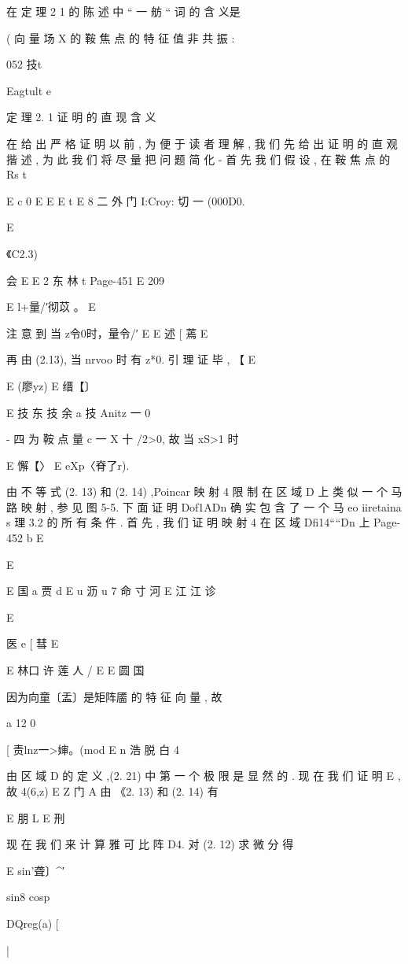 {{{{{{{在 定 理 2 1 的 陈 述 中 “ 一 舫 “ 词 的 含 义是

( 向 量 场 X 的 鞍 焦 点 的 特 征 值 非 共 振 :

052 技t

Eagtult e

定 理 2. 1 证 明 的 直 现 含 义

在 给 出 严 格 证 明 以 前 , 为 便 于 读 者 理 解 , 我 们 先 给 出 证 明 的 直
观 揩 述 , 为 此 我 们 将 尽 量 把 问 题 简 化 - 首 先 我 们 假 设 , 在 鞍 焦 点 的
Rs t

E
c
0
E E
E t
E
8 二 外 门 I:Croy: 切 一 (000D0.

E

《C2.3)

会
E
E 2 东 林 t
Page-451
E 209

E l+量/′彻苡 。 E

注 意 到 当 z令0时，量令/′ E
E 述 [
蔫 E

再 由 (2.13), 当 nrvoo 时 有 z*0. 引 理 证 毕 , 【
E

E {(廖yz) E 缙【〕 }

E 技 东 技 余 a 技
Anitz 一 0}- 四 为 鞍 点 量 c 一 X 十 /2>0, 故 当 xS>1 时

E 懈【〉 E eXp〈脊了r).

由 不 等 式 (2. 13) 和 (2. 14) ,Poincar 映 射 4 限 制 在 区 域 D 上 类 似
一 个 马 路 映 射 , 参 见 图 5-5. 下 面 证 明 Dof1ADn 确 实 包 含 了 一 个 马
eo iiretaina s
理 3.2 的 所 有 条 件 . 首 先 , 我 们 证 明 映 射 4 在 区 域 Dfi14““Dn 上
Page-452
b E

E

E 国 a 贾 d
E u 沥 u 7 命 寸 河
E 江 江 诊

E

医 e [ 彗 E

E 林口 许 莲 人 /
E E 圆 国

因为向童〔盂〕是矩阵靥 的 特 征 向 量 , 故

a 12
0

[ 责lnz一>婶。(mod E n 浩 脱 白 4

由 区 域 D 的 定 义 ,(2. 21) 中 第 一 个 极 限 是 显 然 的 . 现 在 我 们 证 明
E , 故 4(6,z) E Z 门 A 由
《2. 13) 和 (2. 14) 有

E 朋
L
E 刑

现 在 我 们 来 计 算 雅 可 比 阵 D4. 对 (2. 12) 求 微 分 得

E sin'聋〕^′

sin8 cosp

DQreg(a) [

|

}}}}}}
